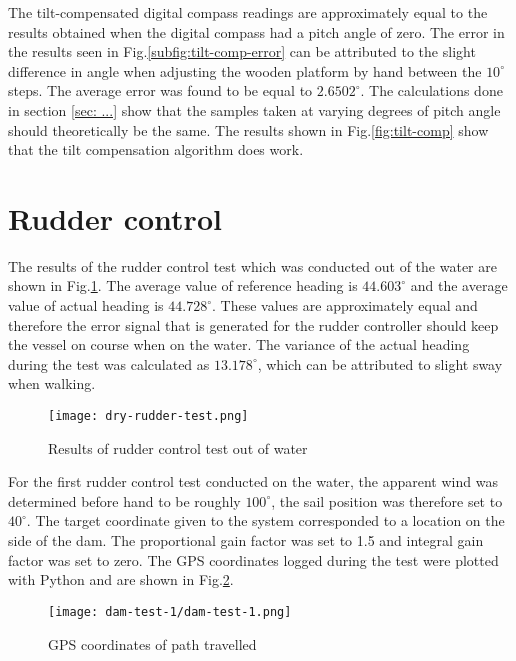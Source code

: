 The tilt-compensated digital compass readings are approximately equal to the results obtained when the digital compass had a pitch angle of zero. The error in the results seen in Fig.\ref{subfig:tilt-comp-error}
can be attributed to the slight difference in angle when adjusting the wooden platform by hand between the $10^{\circ}$ steps. The average error was found to be equal to $2.6502^{\circ}$. The calculations done
in section \ref{sec: ...} show that the samples taken at varying degrees of pitch angle should theoretically be the same. The results shown in Fig.\ref{fig:tilt-comp} show that the tilt compensation 
algorithm does work.

\section{Rudder control}

The results of the rudder control test which was conducted out of the water are shown in Fig.\ref{fig:rudder-control-dry}. The average value of reference heading is $44.603^{\circ}$ and the average value of actual 
heading is $44.728^{\circ}$. These values are approximately equal and therefore the error signal that is generated for the rudder controller should keep the vessel on course when on the water. The variance of the 
actual heading during the test was calculated as $13.178^{\circ}$, which can be attributed to slight sway when walking.  

\begin{figure}
    \centering
    \texttt{[image: dry-rudder-test.png]}
    \caption[Rudder control test out of water]{Results of rudder control test out of water}
    \label{fig:rudder-control-dry}
\end{figure}

For the first rudder control test conducted on the water, the apparent wind was determined before hand to be roughly $100^{\circ}$, the sail position was therefore set to $40^{\circ}$.%
The target coordinate given to the system corresponded to a location on the side of the dam. The proportional gain factor was set to 1.5 and integral gain factor was set to zero. The GPS 
coordinates logged during the test were plotted with Python and are shown in Fig.\ref{fig:rudder-control-test-1-path}. 


\begin{figure}
    \centering
    \texttt{[image: dam-test-1/dam-test-1.png]}
    \caption[Path travelled in first rudder control test]{GPS coordinates of path travelled}
    \label{fig:rudder-control-test-1-path}
\end{figure}


